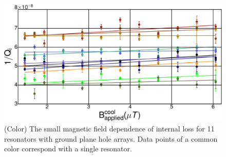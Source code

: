 \begin{figure}
    \begin{center}
        \includegraphics[width=150mm]{DielectricFluxTrap_Supp_Rev2_qnovortex.pdf}
        \caption{(Color)  The small magnetic field dependence of internal loss for 11 resonators with ground plane hole arrays.  Data points of a common color correspond with a single resonator.}
        \label{novortexdata}
    \end{center}
\end{figure}


